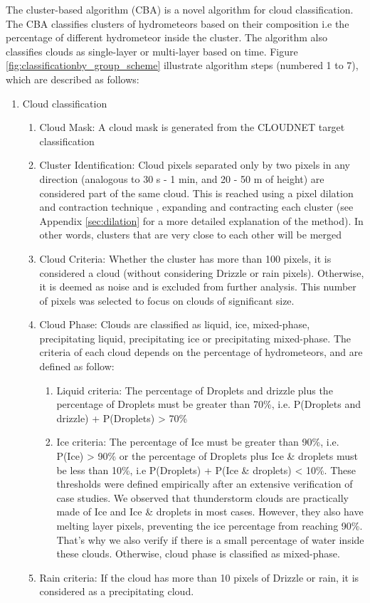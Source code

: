 The cluster-based algorithm (CBA) is a novel algorithm for cloud classification. The CBA classifies clusters of hydrometeors based on their composition i.e the percentage of different hydrometeor inside the cluster. The algorithm also classifies clouds as single-layer or multi-layer based on time. Figure \ref{fig:classificationby_group_scheme} illustrate algorithm steps (numbered 1 to 7), which are described as follows:

\begin{enumerate}
	\item Cloud classification
	
	\begin{enumerate}
		\item Cloud Mask: A cloud mask is generated from the CLOUDNET target classification
		\item Cluster Identification: Cloud pixels separated only by two pixels in any direction (analogous to 30 s - 1 min, and 20 - 50 m of height) are considered part of the same cloud. This is reached using a pixel dilation and contraction technique \citep{doughertyMathematicalMorphologyImage2018}, expanding and contracting each cluster (see Appendix \ref{sec:dilation} for a more detailed explanation of the method). In other words, clusters that are very close to each other will be merged
		\item Cloud Criteria: Whether the cluster has more than 100 pixels, it is considered a cloud (without considering Drizzle or rain pixels). Otherwise, it is deemed as noise and is excluded from further analysis. This number of pixels was selected to focus on clouds of significant size.
		\item Cloud Phase: Clouds are classified as liquid, ice, mixed-phase, precipitating liquid, precipitating ice or precipitating mixed-phase. The criteria of each cloud depends on the percentage of hydrometeors, and are defined as follow: 
		
		\begin{enumerate}
			\item Liquid criteria: The percentage of Droplets and drizzle plus the percentage of Droplets must be greater than 70\%, i.e. P(Droplets and drizzle) + P(Droplets) > 70\%
			\item Ice criteria: The percentage of Ice must be greater than 90\%, i.e. P(Ice) > 90\% or the percentage of Droplets plus Ice \& droplets must be less than 10\%, i.e P(Droplets) + P(Ice \& droplets) < 10\%. These thresholds were defined empirically after an extensive verification of case studies. We observed that thunderstorm clouds are practically made of Ice and Ice \& droplets in most cases. However, they also have melting layer pixels, preventing the ice percentage from reaching 90\%. That's why we also verify if there is a small percentage of water inside these clouds. Otherwise, cloud phase is classified as mixed-phase.
		\end{enumerate}
		\item Rain criteria: If the cloud has more than 10 pixels of Drizzle or rain, it is considered as a precipitating cloud.
	\end{enumerate}
	

\end{enumerate}

